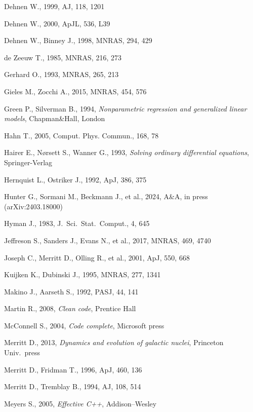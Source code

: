\documentclass[12pt]{article}
\begin{document}
\begin{thebibliography}{99}
Dehnen W., 1999, AJ, 118, 1201

Dehnen W., 2000, ApJL, 536, L39

Dehnen W., Binney J., 1998, MNRAS, 294, 429

de Zeeuw T., 1985, MNRAS, 216, 273

Gerhard O., 1993, MNRAS, 265, 213

Gieles M., Zocchi A., 2015, MNRAS, 454, 576

Green P., Silverman B., 1994, \textsl{Nonparametric regression and generalized linear models}, Chapman\&Hall, London

Hahn T., 2005, Comput. Phys. Commun., 168, 78

Hairer E., N{\o}rsett S., Wanner G., 1993, \textsl{Solving ordinary differential equations}, Springer-Verlag

Hernquist L., Ostriker J., 1992, ApJ, 386, 375

Hunter G., Sormani M., Beckmann J., et al., 2024, A\&A, in press (arXiv:2403.18000)

Hyman J., 1983, J.~Sci.~Stat.~Comput., 4, 645

Jeffreson S., Sanders J., Evans N., et al., 2017, MNRAS, 469, 4740

Joseph C., Merritt D., Olling R., et al., 2001, ApJ, 550, 668

Kuijken K., Dubinski J., 1995, MNRAS, 277, 1341

Makino J., Aarseth S., 1992, PASJ, 44, 141

Martin R., 2008, \textsl{Clean code}, Prentice Hall

McConnell S., 2004, \textsl{Code complete}, Microsoft press

Merritt D., 2013, \textsl{Dynamics and evolution of galactic nuclei}, Princeton Univ.\ press

Merritt D., Fridman T., 1996, ApJ, 460, 136

Merritt D., Tremblay B., 1994, AJ, 108, 514

Meyers S., 2005, \textsl{Effective C++}, Addison--Wesley


\end{thebibliography}
\end{document}

